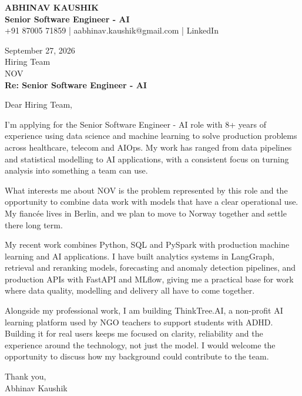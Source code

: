 \documentclass[10pt,a4paper]{article}
\begin{document}
\begin{center}
{\Large\bfseries ABHINAV KAUSHIK}\\[2pt]
{\bfseries Senior Software Engineer - AI}\\[2pt]
+91 87005 71859 \quad | \quad aabhinav.kaushik@gmail.com \quad | \quad LinkedIn
\end{center}
\vspace{8pt}
September 27, 2026\\[6pt]
Hiring Team\\
NOV\\[4pt]
\textbf{Re: Senior Software Engineer - AI}

Dear Hiring Team,

I’m applying for the Senior Software Engineer - AI role with 8+ years of experience using data science and machine learning to solve production problems across healthcare, telecom and AIOps. My work has ranged from data pipelines and statistical modelling to AI applications, with a consistent focus on turning analysis into something a team can use.

What interests me about NOV is the problem represented by this role and the opportunity to combine data work with models that have a clear operational use. My fiancée lives in Berlin, and we plan to move to Norway together and settle there long term.

My recent work combines Python, SQL and PySpark with production machine learning and AI applications. I have built analytics systems in LangGraph, retrieval and reranking models, forecasting and anomaly detection pipelines, and production APIs with FastAPI and MLflow, giving me a practical base for work where data quality, modelling and delivery all have to come together.

Alongside my professional work, I am building ThinkTree.AI, a non-profit AI learning platform used by NGO teachers to support students with ADHD. Building it for real users keeps me focused on clarity, reliability and the experience around the technology, not just the model. I would welcome the opportunity to discuss how my background could contribute to the team.

Thank you,\\
Abhinav Kaushik
\end{document}

